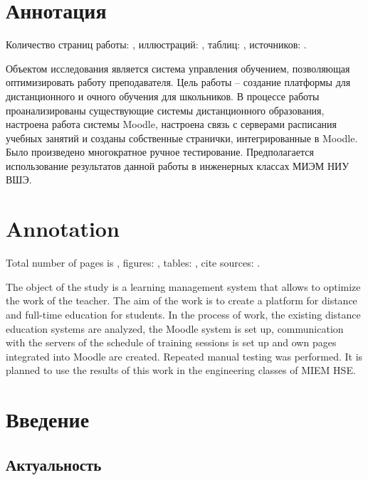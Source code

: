 \documentclass[a4paper,14pt]{article}
\begin{document}


\section*{Аннотация}

Количество страниц работы: \getlastpage, иллюстраций: \totalfigures, таблиц: \totaltables, источников: \LastBib.

Объектом исследования является система управления обучением, позволяющая оптимизировать работу преподавателя. 
Цель работы -- создание платформы для дистанционного и очного обучения для школьников. 
В процессе работы проанализированы существующие системы дистанционного образования, настроена работа системы Moodle, настроена связь с серверами расписания учебных занятий и созданы собственные странички, интегрированные в Moodle. 
Было произведено многократное ручное тестирование. 
Предполагается использование результатов данной работы в инженерных классах МИЭМ НИУ ВШЭ.


\pagebreak

\section*{Annotation}

Total number of pages is \getlastpage, figures: \totalfigures, tables: \totaltables, cite sources: \LastBib.

The object of the study is a learning management system that allows to optimize the work of the teacher. 
The aim of the work is to create a platform for distance and full-time education for students. 
In the process of work, the existing distance education systems are analyzed, the Moodle system is set up, communication with the servers of the schedule of training sessions is set up and own pages integrated into Moodle are created. 
Repeated manual testing was performed. 
It is planned to use the results of this work in the engineering classes of MIEM HSE.

\pagebreak

\tableofcontents
\pagebreak

\section{Введение}


\subsection{Актуальность}
\end{document}

